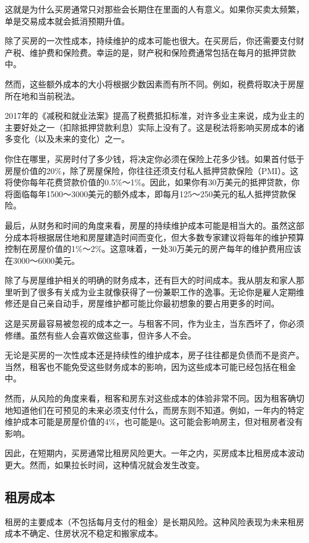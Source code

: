 这就是为什么买房通常只对那些会长期住在里面的人有意义。如果你买卖太频繁，单是交易成本就会抵消预期升值。

除了买房的一次性成本，持续维护的成本可能也很大。在买房后，你还需要支付财产税、维护费和保险费。幸运的是，财产税和保险费通常包括在每月的抵押贷款中。

然而，这些额外成本的大小将根据少数因素而有所不同。例如，税费将取决于房屋所在地和当前税法。

2017年的《减税和就业法案》提高了税费抵扣标准，对许多业主来说，成为业主的主要好处之一（扣除抵押贷款利息）实际上没有了。这是税法将影响买房成本的诸多变化（以及未来的变化）之一。

你住在哪里，买房时付了多少钱，将决定你必须在保险上花多少钱。如果首付低于房屋价值的20\%，除了房屋保险，你往往还须支付私人抵押贷款保险（PMI）。这将使你每年花费贷款价值的0.5\%～1\%。因此，如果你有30万美元的抵押贷款，你将面临每年1500～3000美元的额外成本，即每月125～250美元的私人抵押贷款保险。

最后，从财务和时间的角度来看，房屋的持续维护成本可能是相当大的。虽然这部分成本将根据居住地和房屋建造时间而变化，但大多数专家建议将每年的维护预算控制在房屋价值的1\%～2\%。这意味着，一处30万美元的房产每年的维护费用应该在3000～6000美元。

除了与房屋维护相关的明确的财务成本，还有巨大的时间成本。我从朋友和家人那里听到了很多有关成为业主就像获得了一份兼职工作的逸事。无论你是雇人定期维修还是自己亲自动手，房屋维护都可能比你最初想象的要占用更多的时间。

这是买房最容易被忽视的成本之一。与租客不同，作为业主，当东西坏了，你必须修缮。虽然有些人会喜欢做这些事，但许多人不会。

无论是买房的一次性成本还是持续性的维护成本，房子往往都是负债而不是资产。当然，租客也不能免受这些财务成本的影响，因为这些成本可能已经包括在租金中。

然而，从风险的角度来看，租客和房东对这些成本的体验非常不同。因为租客确切地知道他们在可预见的未来必须支付什么，而房东则不知道。例如，一年内的特定维护成本可能是房屋价值的4\%，也可能是0。这可能会影响房主，但对租房者没有影响。

因此，在短期内，买房通常比租房风险更大。一年之内，买房成本比租房成本波动更大。然而，如果拉长时间，这种情况就会发生改变。

\subsection{租房成本}
租房的主要成本（不包括每月支付的租金）是长期风险。这种风险表现为未来租房成本不确定、住房状况不稳定和搬家成本。

